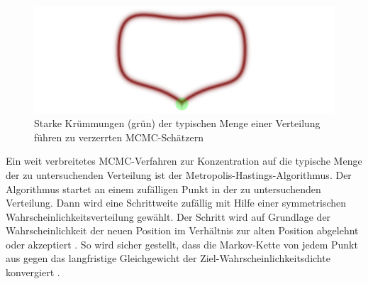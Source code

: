 \documentclass[ngerman]{ttlab-qualify}
\begin{document}
\begin{figure}[H]
\begin{center}
\includegraphics[scale=.9]{images/markov-chain-curve-betancourt-2017}
\caption{Starke Krümmungen (grün) der typischen Menge einer Verteilung führen zu verzerrten MCMC-Schätzern \parencite{betancourt:2017}}
\label{fig:markov-chain-curve}
\end{center}
\end{figure}




Ein weit verbreitetes MCMC-Verfahren zur Konzentration auf die typische Menge der zu untersuchenden Verteilung ist der Metropolis-Hastings-Algorithmus. Der Algorithmus startet an einem zufälligen Punkt in der zu untersuchenden Verteilung.
Dann wird eine Schrittweite zufällig mit Hilfe einer symmetrischen Wahrscheinlichkeitsverteilung gewählt.
Der Schritt wird auf Grundlage der Wahrscheinlichkeit der neuen Position im Verhältnis zur alten Position abgelehnt oder akzeptiert \parencite{hanson:2001}.
So wird sicher gestellt, dass die Markov-Kette von jedem Punkt aus gegen das langfristige Gleichgewicht der Ziel-Wahrscheinlichkeitsdichte konvergiert \parencite{bertschinger:2018}.\\
\end{document}
